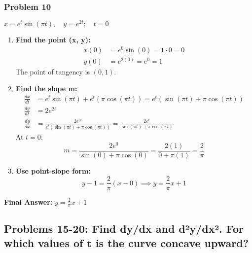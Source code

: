\documentclass{article}
\begin{document}
\subsubsection{Problem 10}
$x = e^t \sin(\pi t), \quad y = e^{2t}; \quad t = 0$
\begin{enumerate}
    \item \textbf{Find the point (x, y):}
    \begin{align*}
    x(0) &= e^0 \sin(0) = 1 \cdot 0 = 0 \\
    y(0) &= e^{2(0)} = e^0 = 1
    \end{align*}
    The point of tangency is $(0, 1)$.
    \item \textbf{Find the slope m:}
    \begin{align*}
    \frac{dx}{dt} &= e^t \sin(\pi t) + e^t(\pi \cos(\pi t)) = e^t(\sin(\pi t) + \pi \cos(\pi t)) \\
    \frac{dy}{dt} &= 2e^{2t} \\
    \frac{dy}{dx} &= \frac{2e^{2t}}{e^t(\sin(\pi t) + \pi \cos(\pi t))} = \frac{2e^{t}}{\sin(\pi t) + \pi \cos(\pi t)}
    \end{align*}
    At $t=0$:
    \[ m = \frac{2e^{0}}{\sin(0) + \pi \cos(0)} = \frac{2(1)}{0 + \pi(1)} = \frac{2}{\pi} \]
    \item \textbf{Use point-slope form:}
    \[ y - 1 = \frac{2}{\pi}(x - 0) \implies y = \frac{2}{\pi}x + 1 \]
\end{enumerate}
\textbf{Final Answer:} $y = \frac{2}{\pi}x + 1$

\subsection{Problems 15-20: Find dy/dx and d²y/dx². For which values of t is the curve concave upward?}
\end{document}
